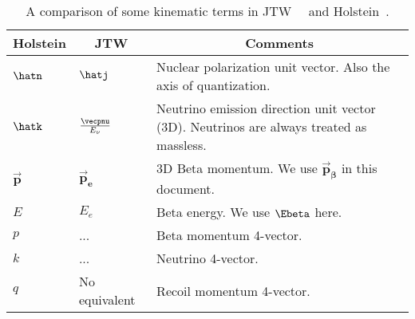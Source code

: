 %
%
%
\renewcommand{\arraystretch}{1.6}
\begin{table}[h!!!!t]
	\begin{center}
	\begin{tabular}{ | l | l | p{3.35in} | }
		\multicolumn{1}{c}{Holstein} 				& \multicolumn{1}{c}{JTW} 					& \multicolumn{1}{c}{Comments}
		\\  \hline
		$\hatn$ 									& $\hatj$									& Nuclear polarization unit vector.  Also the axis of quantization.  %
		\\  \hline
		$\hatk$ 									& $\frac{\vecpnu}{E_\nu}$					& Neutrino emission direction unit vector (3D).  Neutrinos are always treated as massless.
		\\  \hline
		$\bm{\vec{p}} $								& $\bm{\vec{p}_e}$							& 3D Beta momentum.  We use $\bm{\vec{p}_\beta}$ in this document.
		\\  \hline
		$E$											& $E_e$										& Beta energy.  We use $\Ebeta$ here.
		\\  \hline
		$p$											& ...										& Beta momentum 4-vector.
		\\  \hline
		$k$											& ...										& Neutrino 4-vector.
		\\  \hline
		$q$											& No equivalent								& Recoil momentum 4-vector.
		\\  \hline
	\end{tabular}
	\end{center}
	\caption[Notation Guide]{A comparison of some kinematic terms in JTW~\cite{jtw}~\cite{jtw_coulomb} and Holstein~\cite{holstein}.}
	\label{table:compare_notation_kinematic}
\end{table}
\renewcommand{\arraystretch}{1}
%
%